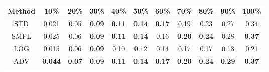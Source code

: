 \documentclass{standalone}
\begin{document}
\begin{tabular}{c|cccccccccc}
      \toprule
      Method & 10\% & 20\% & 30\% & 40\% & 50\% & 60\% & 70\% & 80\% & 90\% & 100\% \\
      \midrule
STD & 0.021 & 0.05 & \textbf{0.09} & \textbf{0.11} & \textbf{0.14} & \textbf{0.17} & 0.19 & 0.23 & 0.27 & 0.34\\
SMPL & 0.025 & 0.06 & \textbf{0.09} & \textbf{0.11} & \textbf{0.14} & 0.16 & \textbf{0.20} & \textbf{0.24} & 0.28 & \textbf{0.37}\\
LOG & 0.015 & 0.06 & \textbf{0.09} & 0.10 & 0.12 & 0.14 & 0.17 & 0.17 & 0.18 & 0.21\\
ADV & \textbf{0.044} & \textbf{0.07} & \textbf{0.09} & \textbf{0.11} & \textbf{0.14} & \textbf{0.17} & \textbf{0.20} & \textbf{0.24} & \textbf{0.29} & \textbf{0.37}\\
  \bottomrule
\end{tabular}
\end{document}
